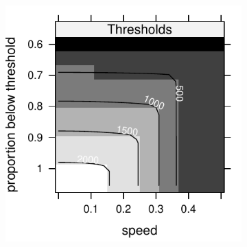 \documentclass[12pt,english]{article}
\begin{document}
\begin{spacing}{1.9}
\begin{figure}[htbp]
\begin{subfigure}{.33\textwidth}
\includegraphics[width=1\textwidth]{plots/Threshold.pdf}
\end{subfigure}
\caption{
}
\label{management}
\end{figure}


\pagebreak




\end{spacing}
\end{document}

